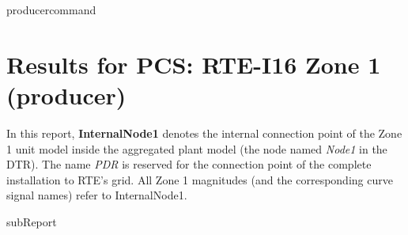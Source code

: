 {{ producercommand }}



    \section{Results for PCS: RTE-I16 Zone 1 ({{producer}})}

    In this report, \textbf{InternalNode1} denotes the internal connection point of the
    Zone 1 unit model inside the aggregated plant model (the node named \emph{Node1} in
    the DTR). The name \emph{PDR} is reserved for the connection point of the complete
    installation to RTE's grid. All Zone 1 magnitudes (and the corresponding curve signal
    names) refer to InternalNode1.

    {{subReport}}
    \newpage

